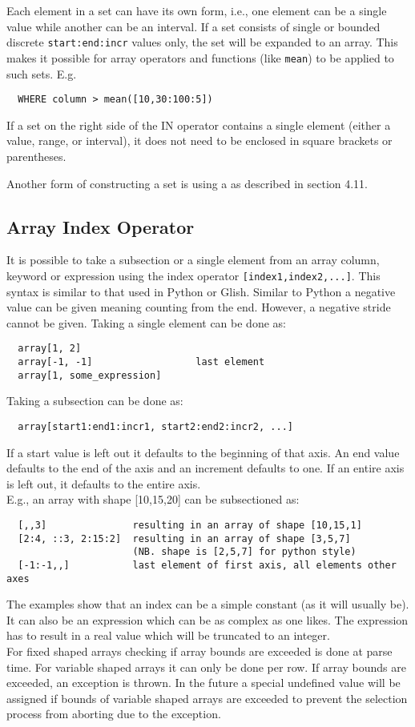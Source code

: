 Each element in a set can have its own form, i.e., one element can
be a single value while another can be an interval.
If a set consists of single or bounded discrete
\texttt{start:end:incr} values only, the set will be expanded to an
array.
This makes it possible for array operators and functions
(like \texttt{mean}) to be applied to such sets. E.g.
\begin{verbatim}
  WHERE column > mean([10,30:100:5])
\end{verbatim}
If a set on the right side of the IN operator contains a single
element  (either a value, range, or interval), it does not need to be
enclosed in square brackets or parentheses. 

Another form of constructing a set is using a
 as described in section 4.11.

\subsection{\label{TAQL:INDEXING}Array Index Operator}
It is possible to take a subsection or a
single element from an array column, keyword or expression
using the index operator
\texttt{[index1,index2,...]}. This syntax
is similar to that used in Python or Glish. Similar to Python a
negative value can be given meaning counting from the end. However, a
negative stride cannot be given.
Taking a single element can be done as:
\begin{verbatim}
  array[1, 2]
  array[-1, -1]                  last element
  array[1, some_expression]
\end{verbatim}
Taking a subsection can be done as:
\begin{verbatim}
  array[start1:end1:incr1, start2:end2:incr2, ...]
\end{verbatim}
If a start value is left out it defaults to the beginning of
that axis. An end value defaults to the end of the axis and
an increment defaults to one. If an entire axis is left out,
it defaults to the entire axis.
\\E.g., an array with shape [10,15,20] can be subsectioned as:
\begin{verbatim}
  [,,3]               resulting in an array of shape [10,15,1]
  [2:4, ::3, 2:15:2]  resulting in an array of shape [3,5,7]
                      (NB. shape is [2,5,7] for python style)
  [-1:-1,,]           last element of first axis, all elements other axes
\end{verbatim}
The examples show that an index can be a simple constant (as it will
usually be). It can also be an expression which can be as complex
as one likes. The expression has to result in a real value
which will be truncated to an integer.
\\For fixed shaped arrays checking if array bounds are exceeded
is done at parse time.
For variable shaped arrays
it can only be done per row. If array bounds are exceeded,
an exception is thrown. In the future a special undefined value
will be assigned if bounds of variable shaped arrays are exceeded
to prevent the selection process from aborting due to the exception.

